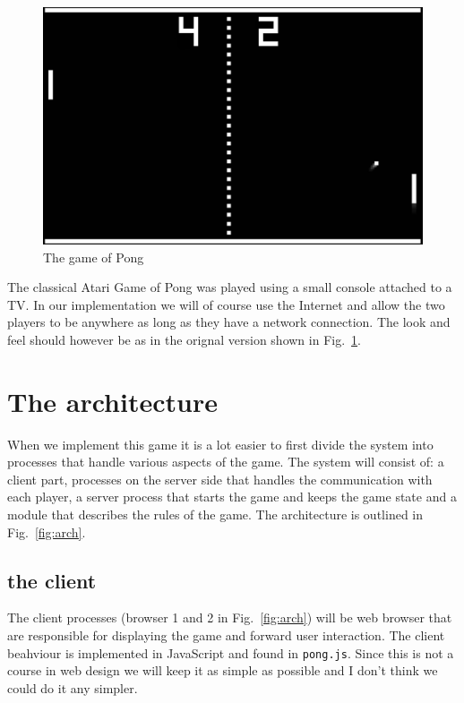 \documentclass[a4paper,11pt]{article}
\begin{document}
\begin{figure}[t]
  \center 
  \includegraphics[scale=0.1]{pong.png}

  \caption{The game of Pong}
  \label{fig:pong}
\end{figure}

The classical Atari Game of Pong was played using a small console
attached to a TV. In our implementation we will of course use the
Internet and allow the two players to be anywhere as long as they have
a network connection. The look and feel should however be as in the orignal version shown in Fig.~\ref{fig:pong}.

\section*{The architecture}
  
When we implement this game it is a lot easier to first divide the
system into processes that handle various aspects of the game. The
system will consist of: a client part, processes on the server side
that handles the communication with each player, a server process that
starts the game and keeps the game state and a module that describes
the rules of the game. The architecture is outlined in Fig.~\ref{fig:arch}. 

\subsection*{the client}

The client processes (browser 1 and 2 in Fig.~\ref{fig:arch}) will be
web browser that are responsible for displaying the game and forward
user interaction. The client beahviour is implemented in JavaScript
and found in {\tt pong.js}. Since this is not a course in web design
we will keep it as simple as possible and I don't think we could do it
any simpler.
\end{document}
